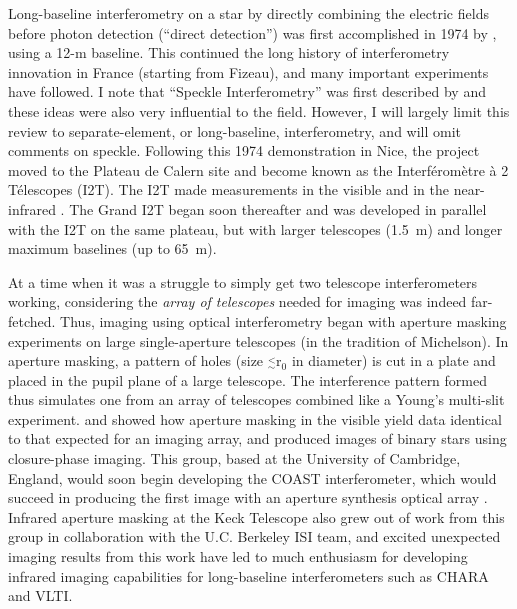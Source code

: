 \documentclass[12pt]{iopart}
\newcommand{\simle}{\mbox{$\stackrel{<}{_{\sim}}$}}
\begin{document}
Long-baseline interferometry on a star by directly combining the
electric fields before photon detection (``direct detection'') was
first accomplished in 1974 by \citet{labeyrie1975}, using a 12-m
baseline.  This continued the long history of interferometry
innovation in France (starting from Fizeau), and many important
experiments have followed.  I note that ``Speckle Interferometry''
was first described by \citet{labeyrie1970} and these ideas were also
very influential to the field.  However, I will largely limit this
review to separate-element, or long-baseline, interferometry, and will
omit comments on speckle.  Following this 1974 demonstration in Nice,
the project moved to the Plateau de Calern site and become known as
the Interf{\' e}rom{\` e}tre {\` a} 2 T{\' e}lescopes (I2T).  The I2T
made measurements in the visible \citep[e.g.,][]{blazit1977} and in
the near-infrared \citep{benedetto1983,benedetto1985}.  The Grand I2T
\citep[GI2T,][]{gi2t1994} began soon thereafter and was developed in
parallel with the I2T on the same plateau, but with larger telescopes
(1.5~m) and longer maximum baselines (up to 65~m).

At a time when it was a struggle to simply get two telescope
interferometers working, considering the {\em array of telescopes}
needed for imaging was indeed far-fetched. Thus, imaging using optical
interferometry began with aperture masking experiments on large
single-aperture telescopes (in the tradition of Michelson).  In
aperture masking, a pattern of holes (size $\simle$r$_0$ in diameter)
is cut in a plate and placed in the pupil plane of a large telescope.
The interference pattern formed thus simulates one from an array of
telescopes combined like a Young's multi-slit experiment.
\citet{baldwin1986} and \citet{haniff1987} showed how aperture masking
in the visible yield data identical to that expected for an imaging
array, and produced images of binary stars using closure-phase
imaging.  This group, based at the University of Cambridge, England,
would soon begin developing the COAST interferometer, which would
succeed in producing the first image with an aperture synthesis
optical array \citep{baldwin1996}.  Infrared aperture masking at the
Keck Telescope \citep{tuthill2000} also grew out of work from this group 
in collaboration with the U.C. Berkeley ISI team, and excited
unexpected imaging results from this work have led to much enthusiasm
for developing infrared imaging capabilities for long-baseline
interferometers such as CHARA and VLTI.
\end{document}
